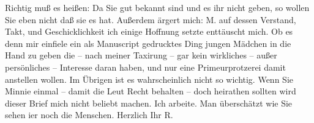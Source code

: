 \begin{ledgroupsized}[t]{13cm}
               Richtig muß es heißen: Da Sie gut bekannt sind und es ihr nicht geben, so wollen Sie
               eben nicht daß sie es hat. Außerdem ärgert mich: M. auf dessen Verstand, Takt, und Geschicklichkeit ich einige Hoffnung
               setzte enttäuscht mich. Ob es denn mir einfiele ein als Manuscript gedrucktes Ding
               jungen Mädchen in die Hand zu
               geben die – nach meiner Taxirung – gar kein wirkliches – außer persönliches –
               Interesse daran haben, und nur eine Primeurprotzerei damit anstellen wollen. Im
               Übrigen ist es wahrscheinlich nicht so wichtig.\pend
           \pstart
           Wenn Sie Minnie einmal – damit die Leut Recht
               behalten – doch heirathen sollten wird dieser Brief mich nicht beliebt machen.\pend
           \pstart
           Ich arbeite. Man überschätzt wie Sie sehen i{\geminationm}er noch die
               Menschen. Herzlich Ihr \spacefill\mbox{R.}\pend
           \endnumbering{}\end{ledgroupsized}  \newcommand{\dateiname}{L01053}\newcommand{\titel}{Richard Beer-Hofmann an Arthur Schnitzler, 13. 7. 1900}\newcommand{\editorInnen}{Martin Anton Müller und Gerd-Hermann Susen}
      